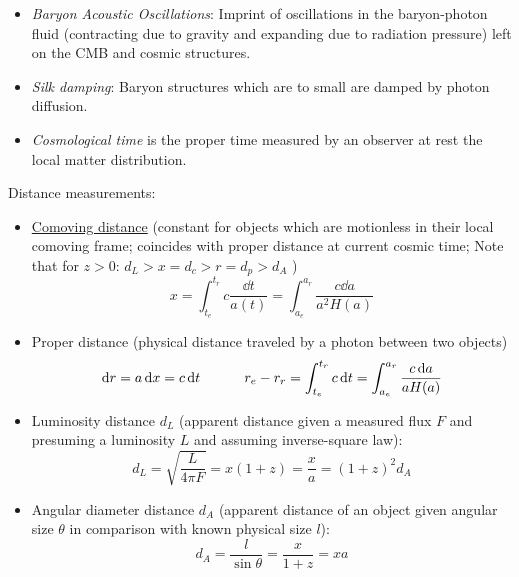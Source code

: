 \begin{itemize}
			\item \emph{Baryon Acoustic Oscillations}: Imprint of oscillations in the baryon-photon fluid (contracting due to gravity and expanding due to radiation pressure) left on the CMB and cosmic structures.
			\item \emph{Silk damping}: Baryon structures which are to small are damped by photon diffusion.
			\item \emph{Cosmological time} is the proper time measured by an observer at rest \wrt the local matter distribution.
		\end{itemize}

		\noindent
		Distance measurements:
		\begin{itemize}
			\item \href{https://en.wikipedia.org/wiki/Comoving_and_proper_distances}{Comoving distance} (constant for objects which are motionless in their local comoving frame; coincides with proper distance at current cosmic time; Note that for $z>0$: $d_L > x = d_c > r = d_p > d_A$ )
				\begin{equation}
					x = \int_{t_e}^{t_r} c\frac{\dd t}{a(t)}
					= \int_{a_e}^{a_r} \frac{c \dd{a}}{a^2 H(a)}
				\end{equation}
			\item Proper distance (physical distance traveled by a photon between two objects)
				\begin{equation}
					\dd r = a \dd{x} = c \dd{t}
					\hspace{30pt}
					r_e - r_r = \int_{t_e}^{t_r} c \dd{t}
					= \int_{a_e}^{a_r} \frac{c\dd{a}}{a H(a)}
				\end{equation}
			\item Luminosity distance $d_L$ (apparent distance given a measured flux $F$ and presuming a luminosity $L$ and assuming inverse-square law):
				\begin{equation}
					d_L = \sqrt{\frac{L}{4 \pi F}} = x (1+z) = \frac{x}{a} = (1+z)^2 d_A
				\end{equation}
			\item Angular diameter distance $d_A$ (apparent distance of an object given angular size $\theta$ in comparison with known physical size $l$):
				\begin{equation}
					d_A = \frac{l}{\sin \theta} = \frac{x}{1+z} = x a
				\end{equation}
		\end{itemize}



